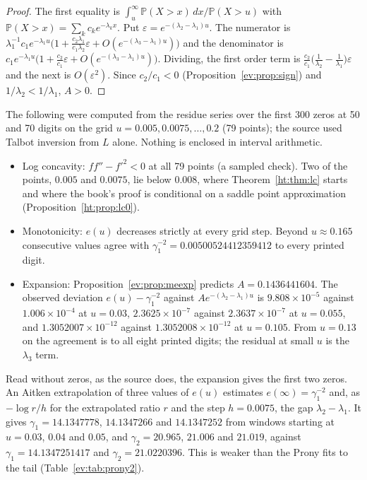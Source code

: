 \begin{proof}
The first equality is $\int_u^\infty\mathbb{P}(X>x)\,dx\big/\mathbb{P}(X>u)$ with $\mathbb{P}(X>x)=\sum_kc_ke^{-\lambda_kx}$. Put $\varepsilon=e^{-(\lambda_2-\lambda_1)u}$. The numerator is $\lambda_1^{-1}c_1e^{-\lambda_1u}\big(1+\frac{c_2\lambda_1}{c_1\lambda_2}\varepsilon+O(e^{-(\lambda_3-\lambda_1)u})\big)$ and the denominator is $c_1e^{-\lambda_1u}\big(1+\frac{c_2}{c_1}\varepsilon+O(e^{-(\lambda_3-\lambda_1)u})\big)$. Dividing, the first order term is $\frac{c_2}{c_1}\big(\frac1{\lambda_2}-\frac1{\lambda_1}\big)\varepsilon$ and the next is $O(\varepsilon^2)$. Since $c_2/c_1<0$ (Proposition~\ref{ev:prop:sign}) and $1/\lambda_2<1/\lambda_1$, $A>0$.
\end{proof}

The following were computed from the residue series over the first $300$ zeros at 50 and 70 digits on the grid $u=0.005,0.0075,\ldots,0.2$ (79 points); the source used Talbot inversion from $L$ alone. Nothing is enclosed in interval arithmetic.
\begin{itemize}
\item Log concavity: $ff''-f'^2<0$ at all 79 points (a sampled check). Two of the points, $0.005$ and $0.0075$, lie below $0.008$, where Theorem~\ref{ht:thm:lc} starts and where the book's proof is conditional on a saddle point approximation (Proposition~\ref{ht:prop:lc0}).
\item Monotonicity: $e(u)$ decreases strictly at every grid step. Beyond $u\approx0.165$ consecutive values agree with $\gamma_1^{-2}=0.00500524412359412$ to every printed digit.
\item Expansion: Proposition~\ref{ev:prop:meexp} predicts $A=0.1436441604$. The observed deviation $e(u)-\gamma_1^{-2}$ against $Ae^{-(\lambda_2-\lambda_1)u}$ is $9.808\times10^{-5}$ against $1.006\times10^{-4}$ at $u=0.03$, $2.3625\times10^{-7}$ against $2.3637\times10^{-7}$ at $u=0.055$, and $1.3052007\times10^{-12}$ against $1.3052008\times10^{-12}$ at $u=0.105$. From $u=0.13$ on the agreement is to all eight printed digits; the residual at small $u$ is the $\lambda_3$ term.
\end{itemize}
Read without zeros, as the source does, the expansion gives the first two zeros. An Aitken extrapolation of three values of $e(u)$ estimates $e(\infty)=\gamma_1^{-2}$ and, as $-\log r/h$ for the extrapolated ratio $r$ and the step $h=0.0075$, the gap $\lambda_2-\lambda_1$. It gives $\gamma_1=14.1347778$, $14.1347266$ and $14.1347252$ from windows starting at $u=0.03$, $0.04$ and $0.05$, and $\gamma_2=20.965$, $21.006$ and $21.019$, against $\gamma_1=14.1347251417$ and $\gamma_2=21.0220396$. This is weaker than the Prony fits to the tail (Table~\ref{ev:tab:prony2}).

